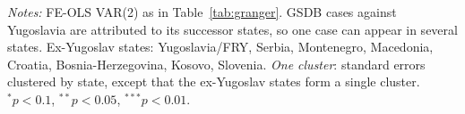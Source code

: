 \begin{table}[htbp]
\begin{threeparttable}
\begin{tabular}{llcccc}
\bottomrule
\end{tabular}
\begin{tablenotes}[flushleft]\footnotesize
\item \textit{Notes:} FE-OLS VAR(2) as in Table~\ref{tab:granger}. GSDB cases against Yugoslavia are attributed to its successor states, so one case can appear in several states. Ex-Yugoslav states: Yugoslavia/FRY, Serbia, Montenegro, Macedonia, Croatia, Bosnia-Herzegovina, Kosovo, Slovenia. \emph{One cluster}: standard errors clustered by state, except that the ex-Yugoslav states form a single cluster. $^{*}p<0.1$, $^{**}p<0.05$, $^{***}p<0.01$.
\end{tablenotes}
\end{threeparttable}
\end{table}
